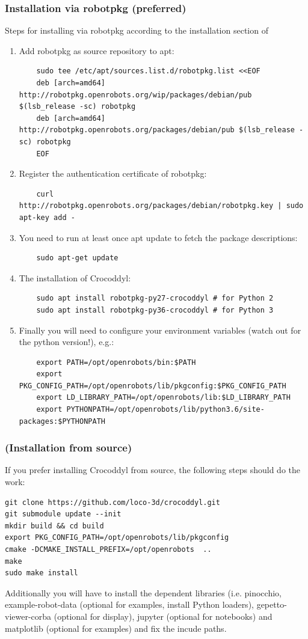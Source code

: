 \subsubsection{Installation via robotpkg (preferred)}
Steps for installing via robotpkg according to the installation section of \cite{crocoddylweb}
\begin{enumerate}
	\item Add robotpkg as source repository to apt:
	\begin{verbatim}
	sudo tee /etc/apt/sources.list.d/robotpkg.list <<EOF
	deb [arch=amd64] http://robotpkg.openrobots.org/wip/packages/debian/pub $(lsb_release -sc) robotpkg
	deb [arch=amd64] http://robotpkg.openrobots.org/packages/debian/pub $(lsb_release -sc) robotpkg
	EOF
	\end{verbatim}
	\item Register the authentication certificate of robotpkg:
	\begin{verbatim}
	curl http://robotpkg.openrobots.org/packages/debian/robotpkg.key | sudo apt-key add -
	\end{verbatim}
	\item You need to run at least once apt update to fetch the package descriptions:
	\begin{verbatim}
	sudo apt-get update
	\end{verbatim}
	\item The installation of Crocoddyl:
	\begin{verbatim}
	sudo apt install robotpkg-py27-crocoddyl # for Python 2
	sudo apt install robotpkg-py36-crocoddyl # for Python 3
	\end{verbatim}
	\item Finally you will need to configure your environment variables (watch out for the python version!), e.g.:
	\begin{verbatim}
	export PATH=/opt/openrobots/bin:$PATH
	export PKG_CONFIG_PATH=/opt/openrobots/lib/pkgconfig:$PKG_CONFIG_PATH
	export LD_LIBRARY_PATH=/opt/openrobots/lib:$LD_LIBRARY_PATH
	export PYTHONPATH=/opt/openrobots/lib/python3.6/site-packages:$PYTHONPATH
	\end{verbatim}
\end{enumerate}

\subsubsection{(Installation from source)}
If you prefer installing Crocoddyl from source, the following steps should do the work:
\begin{verbatim}
git clone https://github.com/loco-3d/crocoddyl.git 
git submodule update --init
mkdir build && cd build
export PKG_CONFIG_PATH=/opt/openrobots/lib/pkgconfig
cmake -DCMAKE_INSTALL_PREFIX=/opt/openrobots  ..
make
sudo make install
\end{verbatim}
Additionally you will have to install the dependent libraries (i.e. pinocchio, example-robot-data (optional for examples, install Python loaders), gepetto-viewer-corba (optional for display), jupyter (optional for notebooks) and matplotlib (optional for examples) and fix the incude paths.

